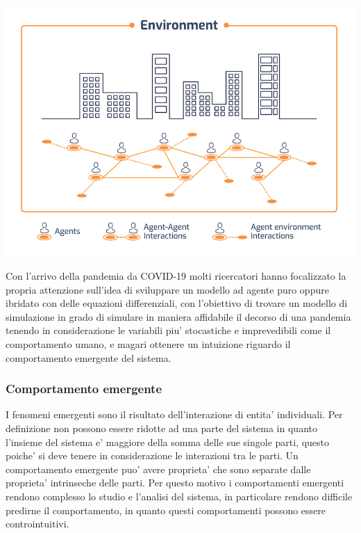 \begin{minipage}{\linewidth}
    \centering
    \includegraphics[scale=0.5]{img/Schematic-representation-of-an-agent-based-model-ABM.png}
    \label{fig:schematic_representation_abm}
\end{minipage}

Con l'arrivo della pandemia da COVID-19 molti ricercatori hanno 
focalizzato la propria attenzione sull'idea di sviluppare un modello 
ad agente puro oppure ibridato \cite{Marzban2021-pd} con delle equazioni
differenziali, con l'obiettivo di 
trovare un modello di simulazione in grado di simulare in maniera 
affidabile il decorso di una pandemia tenendo in considerazione le 
variabili piu' stocastiche e imprevedibili come il comportamento umano, e 
magari ottenere un intuizione riguardo il comportamento emergente del sistema.

\subsubsection*{Comportamento emergente}
I fenomeni emergenti sono il risultato dell'interazione di entita' individuali. 
Per definizione non possono essere ridotte ad una parte del sistema in quanto 
l'insieme del sistema e' maggiore della somma delle sue singole parti, questo poiche' 
si deve tenere in considerazione le interazioni tra le parti. Un comportamento emergente 
puo' avere proprieta' che sono separate dalle proprieta' intrinseche delle parti.
Per questo motivo i comportamenti emergenti rendono complesso lo studio e l'analisi del
sistema, in particolare rendono difficile predirne il comportamento, in quanto questi comportamenti 
possono essere controintuitivi. 

